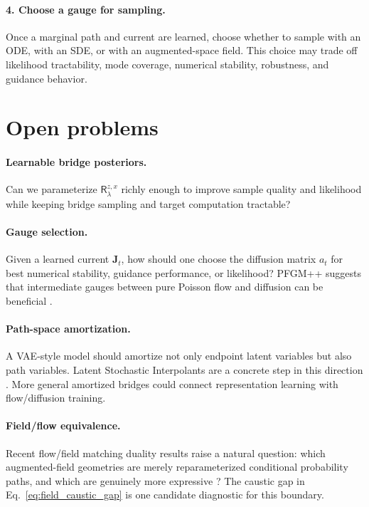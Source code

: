 \documentclass[twoside,11pt]{jmlr}
\numberwithin{equation}{section}
\newcommand{\scrR}{\mathsf{R}}
\newcommand{\J}{\bm J}
\begin{document}
\paragraph{4. Choose a gauge for sampling.}
Once a marginal path and current are learned, choose whether to sample with an ODE, with an SDE, or with an augmented-space field. This choice may trade off likelihood tractability, mode coverage, numerical stability, robustness, and guidance behavior.

\section{Open problems}

\paragraph{Learnable bridge posteriors.}
Can we parameterize $\scrR^{z,x}_\lambda$ richly enough to improve sample quality and likelihood while keeping bridge sampling and target computation tractable?

\paragraph{Gauge selection.}
Given a learned current $\J_t$, how should one choose the diffusion matrix $a_t$ for best numerical stability, guidance performance, or likelihood? PFGM++ suggests that intermediate gauges between pure Poisson flow and diffusion can be beneficial \citep{xu2023pfgmpp}.

\paragraph{Path-space amortization.}
A VAE-style model should amortize not only endpoint latent variables but also path variables. Latent Stochastic Interpolants are a concrete step in this direction \citep{singh2025lsi}. More general amortized bridges could connect representation learning with flow/diffusion training.

\paragraph{Field/flow equivalence.}
Recent flow/field matching duality results raise a natural question: which augmented-field geometries are merely reparameterized conditional probability paths, and which are genuinely more expressive \citep{shlenskii2026duality}? The caustic gap in Eq.~\eqref{eq:field_caustic_gap} is one candidate diagnostic for this boundary.
\end{document}
